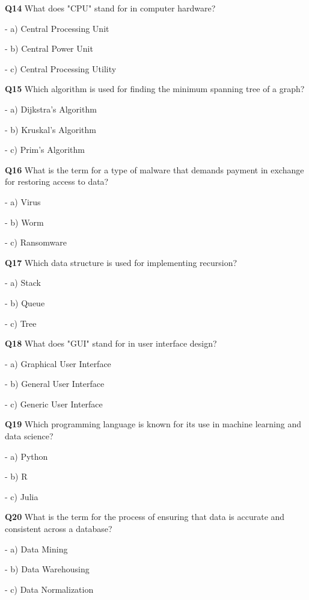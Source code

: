 \textbf{Q14} What does "CPU" stand for in computer hardware?\par
\quad - a) Central Processing Unit\par
\quad - b) Central Power Unit\par
\quad - c) Central Processing Utility\par

\textbf{Q15} Which algorithm is used for finding the minimum spanning tree of a graph?\par
\quad - a) Dijkstra's Algorithm\par
\quad - b) Kruskal's Algorithm\par
\quad - c) Prim's Algorithm\par

\textbf{Q16} What is the term for a type of malware that demands payment in exchange for restoring access to data?\par
\quad - a) Virus\par
\quad - b) Worm\par
\quad - c) Ransomware\par

\textbf{Q17} Which data structure is used for implementing recursion?\par
\quad - a) Stack\par
\quad - b) Queue\par
\quad - c) Tree\par

\textbf{Q18} What does "GUI" stand for in user interface design?\par
\quad - a) Graphical User Interface\par
\quad - b) General User Interface\par
\quad - c) Generic User Interface\par

\textbf{Q19} Which programming language is known for its use in machine learning and data science?\par
\quad - a) Python\par
\quad - b) R\par
\quad - c) Julia\par

\textbf{Q20} What is the term for the process of ensuring that data is accurate and consistent across a database?\par
\quad - a) Data Mining\par
\quad - b) Data Warehousing\par
\quad - c) Data Normalization\par

